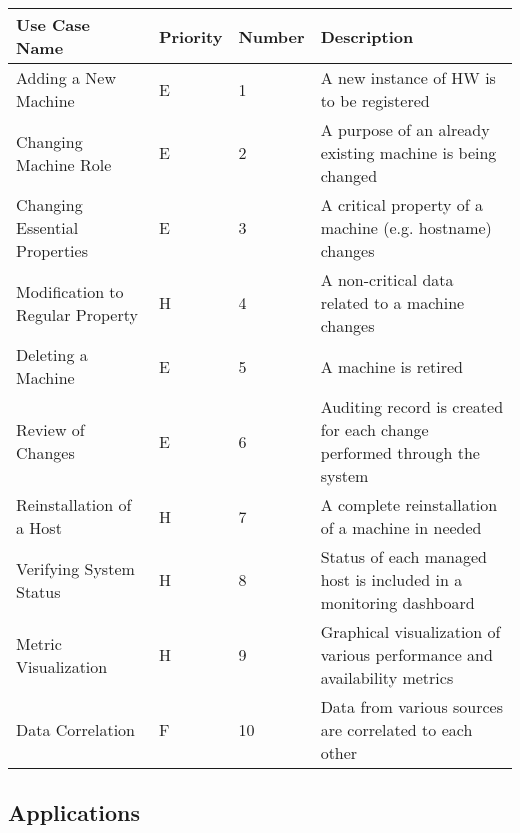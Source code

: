 \documentclass[12pt]{article}
\begin{document}
\begin{center}
	\begin{tabular}{| p{4cm} | p{1.5cm} | p{1.5cm} | p{7cm} |}
		\hline
		\textbf{Use Case Name} & \textbf{Priority} & \textbf{Number} & \textbf{Description}\\
        \hline
        Adding a New Machine & E & 1 & A new instance of HW is to be registered\\
        \hline
        Changing Machine Role & E & 2 & A purpose of an already existing machine is being changed\\
        \hline
        Changing Essential Properties & E & 3 & A critical property of a machine (e.g. hostname) changes\\
        \hline
        Modification to Regular Property & H & 4 & A non-critical data related to a machine changes\\
        \hline
        Deleting a Machine & E & 5 & A machine is retired\\
        \hline
        Review of Changes & E & 6 & Auditing record is created for each change performed through the system\\
        \hline
        Reinstallation of a Host & H & 7 & A complete reinstallation of a machine in needed\\
        \hline
        Verifying System Status & H & 8 & Status of each managed host is included in a monitoring dashboard\\
        \hline
        Metric Visualization & H & 9 & Graphical visualization of various performance and availability metrics\\
		\hline
        Data Correlation & F & 10 & Data from various sources are correlated to each other\\
        \hline
	\end{tabular}
	\label{tab:UseCases}
\end{center}

\subsection{Applications}
\end{document}
